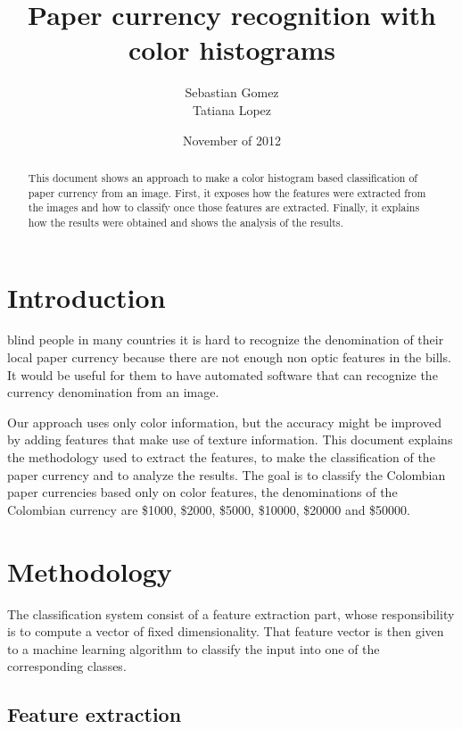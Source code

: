 \documentclass{IEEEtran}
\begin{document}
\title{Paper currency recognition with color histograms}
\date {November of 2012}
\author{Sebastian Gomez \\ Tatiana Lopez}
\maketitle

\begin{abstract}
This document shows an approach to make a color histogram based classification of paper currency from an image.
First, it exposes how the features were extracted from the images and how to classify once those features
are extracted. Finally, it explains how the results were obtained and shows the analysis of the results.
\end{abstract}

\section{Introduction}
 blind people in many countries it is hard to recognize the denomination of their local paper currency because
there are not enough non optic features in the bills. It would be useful for them to have automated software that
can recognize the currency denomination from an image.


Our approach uses only color information, but the accuracy might be improved by adding features that make use of
texture information. This document explains the methodology used to extract the features, to make the classification
of the paper currency and to analyze the results. The goal is to classify the Colombian paper currencies based only
on color features, the denominations of the Colombian currency are \$1000, \$2000, \$5000, \$10000, \$20000 and
\$50000.

\section{Methodology}

The classification system consist of a feature extraction part, whose responsibility is to compute a vector of
fixed dimensionality. That feature vector is then given to a machine learning algorithm to classify the input
into one of the corresponding classes.

\subsection{Feature extraction}
\end{document}
